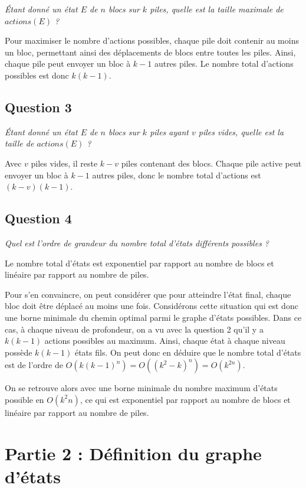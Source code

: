\textit{Étant donné un état $E$ de $n$ blocs sur $k$ piles, quelle est la taille maximale de $actions(E)$ ?}

Pour maximiser le nombre d'actions possibles, chaque pile doit contenir au moins un bloc, permettant ainsi des déplacements de blocs entre toutes les piles. Ainsi, chaque pile peut envoyer un bloc à $k - 1$ autres piles. Le nombre total d'actions possibles est donc $k(k - 1)$.

\subsection{Question 3}

\textit{Étant donné un état $E$ de $n$ blocs sur $k$ piles ayant $v$ piles vides, quelle est la taille de $actions(E)$ ?}

Avec $v$ piles vides, il reste $k - v$ piles contenant des blocs. Chaque pile active peut envoyer un bloc à $k - 1$ autres piles, donc le nombre total d'actions est $(k-v)(k-1)$.

\subsection{Question 4}\label{q:4}

\textit{Quel est l'ordre de grandeur du nombre total d'états différents possibles ?}

Le nombre total d'états est exponentiel par rapport au nombre de blocs et linéaire par rapport au nombre de piles. 

Pour s'en convaincre, on peut considérer que pour atteindre l'état final, chaque bloc doit être déplacé au moins une fois. Considérons cette situation qui est donc une borne minimale du chemin optimal parmi le graphe d'états possibles. Dans ce cas, à chaque niveau de profondeur, on a vu avec la question 2 qu'il y a $k(k - 1)$ actions possibles au maximum. Ainsi, chaque état à chaque niveau possède $k(k - 1)$ états fils. On peut donc en déduire que le nombre total d'états est de l'ordre de $O(k(k - 1)^n) = O((k^2 - k)^n) = O(k^{2n})$.

On se retrouve alors avec une borne minimale du nombre maximum d'états possible en $O(k^2n)$, ce qui est exponentiel par rapport au nombre de blocs et linéaire par rapport au nombre de piles.

\section{Partie 2 : Définition du graphe d'états}

